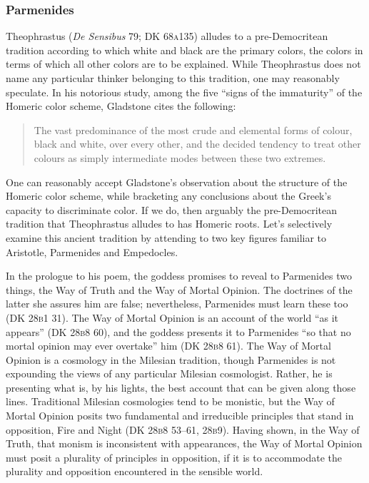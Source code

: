 \begin{frame}[t]\frametitle{Parmenides}
	
\end{frame}

Theophrastus (\emph{De Sensibus} 79; DK 68\textsc{a}135) alludes to a pre-Democritean tradition according to which white and black are the primary colors, the colors in terms of which all other colors are to be explained. While Theo\-phra\-stus does not name any particular thinker belonging to this tradition, one may reasonably speculate. In his notorious study, among the five ``signs of the immaturity'' of the Homeric color scheme, Gladstone cites the following:  
\begin{quote}
    The vast predominance of the most crude and elemental forms of colour, black and white, over every other, and the decided tendency to treat other colours as simply intermediate modes between these two extremes. 
\end{quote}
One can reasonably accept Gladstone's observation about the structure of the Ho\-meric color scheme, while bracketing any conclusions about the Greek's capacity to discriminate color. If we do, then arguably the pre-De\-mo\-cri\-tean tradition that Theophrastus alludes to has Homeric roots. Let's selectively examine this ancient tradition by attending to two key figures familiar to Aristotle, Parmenides and Empedocles.

In the prologue to his poem, the goddess promises to reveal to Parmenides two things, the Way of Truth and the Way of Mortal Opinion. The doctrines of the latter she assures him are false; nevertheless, Parmenides must learn these too (DK 28\textsc{b}1 31). The Way of Mortal Opinion is an account of the world ``as it appears'' (DK 28\textsc{b}8 60), and the goddess presents it to Parmenides ``so that no mortal opinion may ever overtake'' him (DK 28\textsc{b}8 61). The Way of Mortal Opinion is a cosmology in the Milesian tradition, though Parmenides is not expounding the views of any particular Milesian cosmologist. Rather, he is presenting what is, by his lights, the best account that can be given along those lines. Traditional Milesian cosmologies tend to be monistic, but the Way of Mortal Opinion posits two fundamental and irreducible principles that stand in opposition, Fire and Night (DK 28\textsc{b}8 53--61, 28\textsc{b}9). Having shown, in the Way of Truth, that monism is inconsistent with appearances, the Way of Mortal Opinion must posit a plurality of principles in opposition, if it is to accommodate the plurality and opposition encountered in the sensible world.


